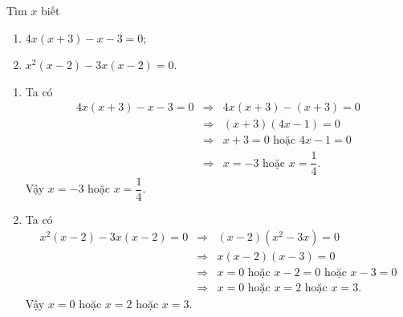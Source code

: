\begin{vn}
	Tìm $x$ biết
	\begin{enumerate}
		\item $4x(x+3)-x-3=0$;
		\item $x^2(x-2)-3x(x-2)=0$.
	\end{enumerate}
	\loigiai
	{
		\begin{enumerate}
		\item Ta có {\allowdisplaybreaks\begin{eqnarray*}
			4x(x+3)-x-3=0 	&\Rightarrow& 4x(x+3)-(x+3)=0\\
			&\Rightarrow& (x+3)(4x-1)=0\\
			&\Rightarrow& x+3=0 \text{ hoặc } 4x-1=0\\
				&\Rightarrow& x=-3\text{ hoặc } x=\dfrac{1}{4}.
		\end{eqnarray*}} 
	Vậy $x=-3$ hoặc $x=\dfrac{1}{4}$.
		\item Ta có 	{\allowdisplaybreaks\begin{eqnarray*}
			x^2(x-2)-3x(x-2)=0	&\Rightarrow& (x-2) \left(x^2 -3x \right)=0 \\
			&\Rightarrow& x(x-2)(x-3)=0\\
			&\Rightarrow& x=0 \text{ hoặc } x-2=0 \text{ hoặc } x-3=0 \\
			&\Rightarrow& x=0 \text{ hoặc } x=2 \text{ hoặc } x=3.
		\end{eqnarray*}} 
	Vậy $x=0$ hoặc $x=2$ hoặc $x=3$.
\end{enumerate}
	}
\end{vn}


